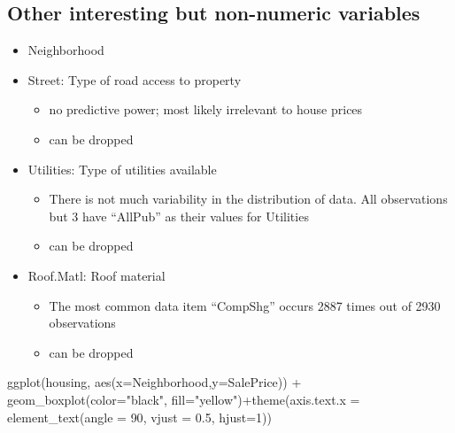 \documentclass[aoas]{imsart}
\newenvironment{Shaded}{\begin{snugshade}}{\end{snugshade}}
\newcommand{\AttributeTok}[1]{\textcolor[rgb]{0.77,0.63,0.00}{#1}}
\newcommand{\DecValTok}[1]{\textcolor[rgb]{0.00,0.00,0.81}{#1}}
\newcommand{\FloatTok}[1]{\textcolor[rgb]{0.00,0.00,0.81}{#1}}
\newcommand{\FunctionTok}[1]{\textcolor[rgb]{0.00,0.00,0.00}{#1}}
\newcommand{\NormalTok}[1]{#1}
\newcommand{\SpecialCharTok}[1]{\textcolor[rgb]{0.00,0.00,0.00}{#1}}
\newcommand{\StringTok}[1]{\textcolor[rgb]{0.31,0.60,0.02}{#1}}
\providecommand{\tightlist}{%
  \setlength{\itemsep}{0pt}\setlength{\parskip}{0pt}}
\numberwithin{equation}{section}
\theoremstyle{plain}
\theoremstyle{remark}
\begin{document}
\hypertarget{other-interesting-but-non-numeric-variables}{%
\subsection{Other interesting but non-numeric
variables}\label{other-interesting-but-non-numeric-variables}}

\begin{itemize}
\tightlist
\item
  Neighborhood
\item
  Street: Type of road access to property

  \begin{itemize}
  \tightlist
  \item
    no predictive power; most likely irrelevant to house prices
  \item
    can be dropped
  \end{itemize}
\item
  Utilities: Type of utilities available

  \begin{itemize}
  \tightlist
  \item
    There is not much variability in the distribution of data. All
    observations but 3 have ``AllPub'' as their values for Utilities
  \item
    can be dropped
  \end{itemize}
\item
  Roof.Matl: Roof material

  \begin{itemize}
  \tightlist
  \item
    The most common data item ``CompShg'' occurs 2887 times out of 2930
    observations
  \item
    can be dropped
  \end{itemize}
\end{itemize}

\begin{Shaded}
\begin{Highlighting}[]
\FunctionTok{ggplot}\NormalTok{(housing, }\FunctionTok{aes}\NormalTok{(}\AttributeTok{x=}\NormalTok{Neighborhood,}\AttributeTok{y=}\NormalTok{SalePrice)) }\SpecialCharTok{+} \FunctionTok{geom\_boxplot}\NormalTok{(}\AttributeTok{color=}\StringTok{"black"}\NormalTok{, }\AttributeTok{fill=}\StringTok{"yellow"}\NormalTok{)}\SpecialCharTok{+}\FunctionTok{theme}\NormalTok{(}\AttributeTok{axis.text.x =} \FunctionTok{element\_text}\NormalTok{(}\AttributeTok{angle =} \DecValTok{90}\NormalTok{, }\AttributeTok{vjust =} \FloatTok{0.5}\NormalTok{, }\AttributeTok{hjust=}\DecValTok{1}\NormalTok{))}
\end{Highlighting}
\end{Shaded}
\end{document}
